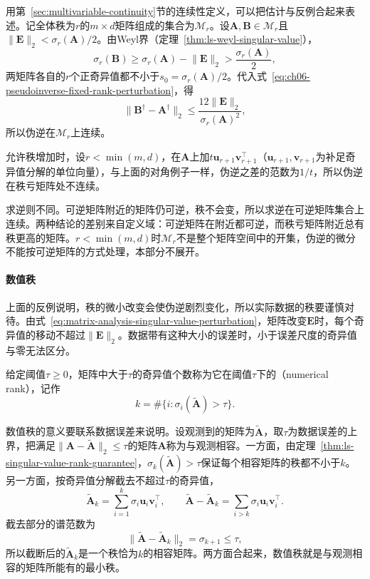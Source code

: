 用第~\ref{sec:multivariable-continuity}节的连续性定义，可以把估计与反例合起来表述。记全体秩为$r$的$m\times d$矩阵组成的集合为$\mathcal M_r$。设$\bm A,\bm B\in\mathcal M_r$且$\lVert\bm E\rVert_2<\sigma_r(\bm A)/2$。由Weyl界（定理~\ref{thm:ls-weyl-singular-value}），
\[
 \sigma_r(\bm B)\geq\sigma_r(\bm A)-\lVert\bm E\rVert_2>\frac{\sigma_r(\bm A)}2 ,
\]
两矩阵各自的$r$个正奇异值都不小于$s_0=\sigma_r(\bm A)/2$。代入式~\eqref{eq:ch06-pseudoinverse-fixed-rank-perturbation}，得
\begin{equation}
 \lVert\bm B^\dagger-\bm A^\dagger\rVert_2\leq\frac{12\lVert\bm E\rVert_2}{\sigma_r(\bm A)^2},
 \label{eq:ls-pseudoinverse-fixed-rank-continuity}
\end{equation}
所以伪逆在$\mathcal M_r$上连续。

允许秩增加时，设$r<\min(m,d)$，在$\bm A$上加$t\bm u_{r+1}\bm v_{r+1}^\top$（$\bm u_{r+1},\bm v_{r+1}$为补足奇异值分解的单位向量），与上面的对角例子一样，伪逆之差的范数为$1/t$，所以伪逆在秩亏矩阵处不连续。

求逆则不同。可逆矩阵附近的矩阵仍可逆，秩不会变，所以求逆在可逆矩阵集合上连续。两种结论的差别来自定义域：可逆矩阵在附近都可逆，而秩亏矩阵附近总有秩更高的矩阵。$r<\min(m,d)$时$\mathcal M_r$不是整个矩阵空间中的开集，伪逆的微分不能按可逆矩阵的方式处理，本部分不展开。

\paragraph{数值秩}
上面的反例说明，秩的微小改变会使伪逆剧烈变化，所以实际数据的秩要谨慎对待。由式~\eqref{eq:matrix-analysis-singular-value-perturbation}，矩阵改变$\bm E$时，每个奇异值的移动不超过$\lVert\bm E\rVert_2$。数据带有这种大小的误差时，小于误差尺度的奇异值与零无法区分。

给定阈值$\tau\geq0$，矩阵中大于$\tau$的奇异值个数称为它在阈值$\tau$下的（numerical rank），记作
\begin{equation}
 k=\#\{i:\sigma_i(\tilde{\bm A})>\tau\}.
 \label{eq:ls-numerical-rank-definition}
\end{equation}

数值秩的意义要联系数据误差来说明。设观测到的矩阵为$\tilde{\bm A}$，取$\tau$为数据误差的上界，把满足$\lVert\bm A-\tilde{\bm A}\rVert_2\leq\tau$的矩阵$\bm A$称为与观测相容。一方面，由定理~\ref{thm:ls-singular-value-rank-guarantee}，$\sigma_k(\tilde{\bm A})>\tau$保证每个相容矩阵的秩都不小于$k$。另一方面，按奇异值分解截去不超过$\tau$的奇异值，
\[
 \tilde{\bm A}_k=\sum_{i=1}^k\sigma_i\bm u_i\bm v_i^\top,\qquad
 \tilde{\bm A}-\tilde{\bm A}_k=\sum_{i>k}\sigma_i\bm u_i\bm v_i^\top .
\]
截去部分的谱范数为
\[
 \lVert\tilde{\bm A}-\tilde{\bm A}_k\rVert_2=\sigma_{k+1}\leq\tau ,
\]
所以截断后的$\tilde{\bm A}_k$是一个秩恰为$k$的相容矩阵。两方面合起来，数值秩就是与观测相容的矩阵所能有的最小秩。

